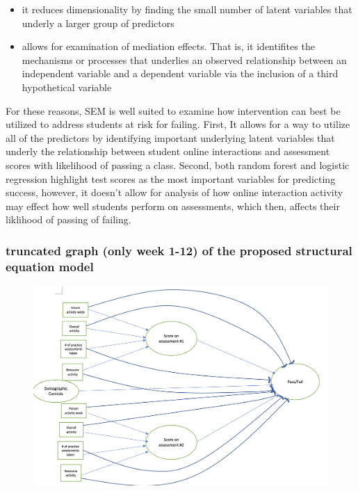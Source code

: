 \documentclass[]{article}
\providecommand{\tightlist}{%
  \setlength{\itemsep}{0pt}\setlength{\parskip}{0pt}}
\begin{document}
\begin{itemize}
\tightlist
\item
  it reduces dimensionality by finding the small number of latent
  variables that underly a larger group of predictors
\item
  allows for examination of mediation effects. That is, it identifites
  the mechanisms or processes that underlies an observed relationship
  between an independent variable and a dependent variable via the
  inclusion of a third hypothetical variable
\end{itemize}

For these reasons, SEM is well suited to examine how intervention can
best be utilized to address students at risk for failing. First, It
allows for a way to utilize all of the predictors by identifying
important underlying latent variables that underly the relationship
between student online interactions and assessment scores with
likelihood of passing a class. Second, both random forest and logistic
regression highlight test scores as the most important variables for
predicting success, however, it doesn't allow for analysis of how online
interaction activity may effect how well students perform on
assessments, which then, affects their liklihood of passing of failing.

\subsubsection{truncated graph (only week 1-12) of the proposed
structural equation
model}\label{truncated-graph-only-week-1-12-of-the-proposed-structural-equation-model}

\begin{figure}
\centering
\includegraphics{sem_model_graph.png}
\caption{}
\end{figure}
\end{document}

